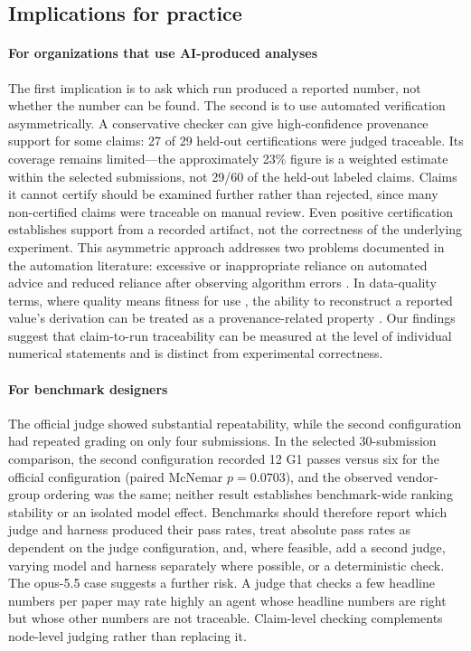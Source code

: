 \documentclass[preprint,12pt,authoryear]{elsarticle}
\begin{document}
\subsection{Implications for practice}

\paragraph{For organizations that use AI-produced analyses} The first implication is to ask which run produced a reported number, not whether the number can be found. The second is to use automated verification asymmetrically. A conservative checker can give high-confidence provenance support for some claims: 27 of 29 held-out certifications were judged traceable. Its coverage remains limited---the approximately 23\% figure is a weighted estimate within the selected submissions, not 29/60 of the held-out labeled claims. Claims it cannot certify should be examined further rather than rejected, since many non-certified claims were traceable on manual review. Even positive certification establishes support from a recorded artifact, not the correctness of the underlying experiment. This asymmetric approach addresses two problems documented in the automation literature: excessive or inappropriate reliance on automated advice \citep{lee2004trust,parasuraman2010complacency} and reduced reliance after observing algorithm errors \citep{dietvorst2015aversion}. In data-quality terms, where quality means fitness for use \citep{wang1996dataquality}, the ability to reconstruct a reported value's derivation can be treated as a provenance-related property \citep{simmhan2005provenance}. Our findings suggest that claim-to-run traceability can be measured at the level of individual numerical statements and is distinct from experimental correctness.

\paragraph{For benchmark designers} The official judge showed substantial repeatability, while the second configuration had repeated grading on only four submissions. In the selected 30-submission comparison, the second configuration recorded 12 G1 passes versus six for the official configuration (paired McNemar $p=0.0703$), and the observed vendor-group ordering was the same; neither result establishes benchmark-wide ranking stability or an isolated model effect. Benchmarks should therefore report which judge and harness produced their pass rates, treat absolute pass rates as dependent on the judge configuration, and, where feasible, add a second judge, varying model and harness separately where possible, or a deterministic check. The opus-5.5 case suggests a further risk. A judge that checks a few headline numbers per paper may rate highly an agent whose headline numbers are right but whose other numbers are not traceable. Claim-level checking complements node-level judging rather than replacing it.
\end{document}
